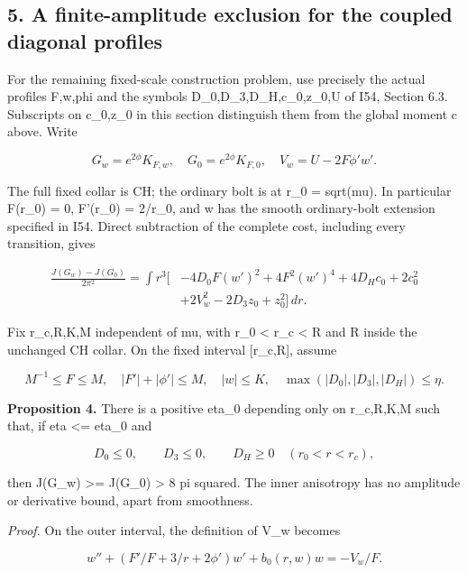 \documentclass[
  10pt,
]{article}
\begin{document}
\hypertarget{a-finite-amplitude-exclusion-for-the-coupled-diagonal-profiles}{%
\subsection{5. A finite-amplitude exclusion for the coupled diagonal
profiles}\label{a-finite-amplitude-exclusion-for-the-coupled-diagonal-profiles}}

For the remaining fixed-scale construction problem, use precisely the
actual profiles F,w,phi and the symbols D\_0,D\_3,D\_H,c\_0,z\_0,U of
I54, Section 6.3. Subscripts on c\_0,z\_0 in this section distinguish
them from the global moment c above. Write

\[
 G_w=e^{2\phi}K_{F,w},\quad G_0=e^{2\phi}K_{F,0},
 \quad V_w=U-2F\phi'w'.
\]

The full fixed collar is CH; the ordinary bolt is at r\_0 = sqrt(mu). In
particular F(r\_0) = 0, F'(r\_0) = 2/r\_0, and w has the smooth
ordinary-bolt extension specified in I54. Direct subtraction of the
complete cost, including every transition, gives

\[
\begin{aligned}
 \frac{J(G_w)-J(G_0)}{2\pi^2}=\int r^3\bigl[
 &-4D_0F(w')^2+4F^2(w')^4+4D_Hc_0+2c_0^2\\
 &+2V_w^2-2D_3z_0+z_0^2\bigr]\,dr.
\end{aligned}\tag{5.1}
\]

Fix r\_c,R,K,M independent of mu, with r\_0 \textless{} r\_c \textless{}
R and R inside the unchanged CH collar. On the fixed interval
{[}r\_c,R{]}, assume

\[
 M^{-1}\le F\le M,\quad |F'|+|\phi'|\le M,\quad |w|\le K,\quad
                   \max(|D_0|,|D_3|,|D_H|)\le\eta.
                                                               \tag{5.2}
\]

\textbf{Proposition 4.} There is a positive eta\_0 depending only on
r\_c,R,K,M such that, if eta \textless= eta\_0 and

\[
 D_0\le0,\qquad D_3\le0,\qquad D_H\ge0
                                     \quad(r_0<r<r_c),  \tag{5.3}
\]

then J(G\_w) \textgreater= J(G\_0) \textgreater{} 8 pi squared. The
inner anisotropy has no amplitude or derivative bound, apart from
smoothness.

\emph{Proof.} On the outer interval, the definition of V\_w becomes

\[
 w''+\left(F'/F+3/r+2\phi'\right)w'+b_0(r,w)w=-V_w/F.
\]
\end{document}
